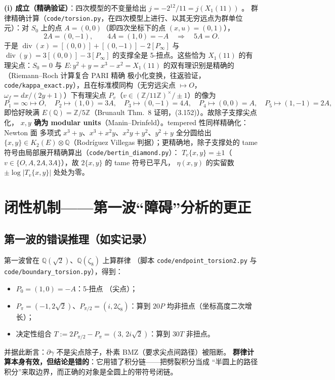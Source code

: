 \documentclass[11pt,a4paper]{ctexart}
\theoremstyle{remark}
\newcommand{\diver}{\mathop{\mathrm{div}}}
\newcommand{\QQ}{\mathbb{Q}}
\newcommand{\ZZ}{\mathbb{Z}}
\begin{document}
\textbf{(i) 成立（精确验证）}：四次模型的不变量给出 $j=-2^{12}/11=j(X_1(11))$ \checkmark。
群律精确计算（\texttt{code/torsion.py}，在四次模型上进行、以其无穷远点为群单位元）：对 $S_0$ 上的点 $A=(0,0)$（即四次坐标下的点 $(x,u)=(0,1)$），
\[
2A=(0,-1),\qquad 4A=(1,0)=-A\quad\Longrightarrow\quad \boxed{5A=O}.
\]
于是 $\diver(x)=[(0,0)]+[(0,-1)]-2[P_\infty]$ 与 $\diver(y)=3[(0,0)]-3[P_\infty]$
的支撑全是 5-扭点。这些恰为 $X_1(11)$ 的有理尖点：$S_0=0$ 与
$E:y^2+y=x^3-x^2=X_1(11)$ 的双有理识别是精确的（Riemann--Roch 计算复合 PARI 精确
极小化变换，往返验证，\texttt{code/kappa\_exact.py}），且在标准模同构（无穷远尖点
$\mapsto O$，$\omega_f=dx/(2y+1)$）下有理尖点 $P_v$（$v\in(\ZZ/11\ZZ)^\times/\pm1$）的像为
\[
P_1=\infty\mapsto O,\quad P_2\mapsto(1,0)=3A,\quad P_3\mapsto(0,-1)=4A,\quad
P_4\mapsto(0,0)=A,\quad P_5\mapsto(1,-1)=2A,
\]
即恰好映满 $E(\QQ)=\ZZ/5\ZZ$（Brunault Thm.~8 证明，(3.152)）。故除子支撑尖点化，
\textbf{$x,y$ 确为 modular units}（Manin--Drinfeld）。tempered 性同样精确化：Newton 面
多项式 $x^3+y$、$x^3+x^2y$、$x^2y+y^2$、$y^2+y$ 全分圆给出
$\{x,y\}\in K_2(E)\otimes\QQ$（Rodr\'iguez Villegas 判据）；更精确地，除子支撑处的
tame 符号由局部展开精确算出（\texttt{code/bertin\_diamond.py}）：
$T_v\{x,y\}=\pm1$（$v\in\{O,A,2A,3A\}$），故 $2\{x,y\}$ 的 tame 符号已平凡，
$\eta(x,y)$ 的实留数 $\pm\log|T_v\{x,y\}|$ 处处为零。

\section{闭性机制——第一波“障碍”分析的更正}\label{sec:obstruction}

\subsection{第一波的错误推理（如实记录）}

第一波曾在 $\QQ(\sqrt2)$、$\QQ(\zeta_8)$ 上算群律
（脚本 \texttt{code/endpoint\_torsion2.py} 与 \texttt{code/boundary\_torsion.py}），得到：
\begin{itemize}[nosep]
\item $P_0=(1,0)=-A$：5-扭点 \checkmark（尖点）；
\item $P_\pi=(-1,2\sqrt2)$、$P_{\pi/2}=(i,2\zeta_8)$：算到 $20P$ 均非扭点（坐标高度二次增长）；
\item 决定性组合 $T:=2P_{\pi/2}-P_\pi=(3,\,2i\sqrt2)$：算到 $30T$ 非扭点。
\end{itemize}
并据此断言：$\partial\gamma$ 不是尖点除子，朴素 BMZ（要求尖点间路径）被阻断。
\textbf{群律计算本身有效，但结论是错的}：它用错了积分链——把劈裂积分当成
“半圆上的路径积分”来取边界，而正确的对象是全圆上的带符号闭链。
\end{document}
